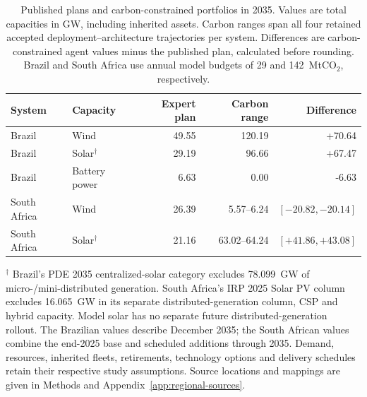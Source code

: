 \begin{table}[tbp]
\caption{Published plans and carbon-constrained portfolios in 2035. Values are total capacities in GW, including inherited assets. Carbon ranges span all four retained accepted deployment--architecture trajectories per system. Differences are carbon-constrained agent values minus the published plan, calculated before rounding. Brazil and South Africa use annual model budgets of 29 and 142~MtCO$_2$, respectively.}
\label{tab:expert-capacity}
\centering\small
\setlength{\tabcolsep}{5pt}
\begin{tabularx}{\textwidth}{@{}lXrrr@{}}
\toprule
System & Capacity & Expert plan & Carbon range & Difference \\
\midrule
Brazil & Wind & 49.55 & 120.19 & +70.64 \\
Brazil & Solar$^\dagger$ & 29.19 & 96.66 & +67.47 \\
Brazil & Battery power & 6.63 & 0.00 & -6.63 \\
South Africa & Wind & 26.39 & 5.57--6.24 & \([-20.82,-20.14]\) \\
South Africa & Solar$^\dagger$ & 21.16 & 63.02--64.24 & \([+41.86,+43.08]\) \\
\bottomrule
\end{tabularx}
\smallskip
\par\footnotesize $^\dagger$ Brazil's PDE 2035 centralized-solar category excludes 78.099~GW of micro-/mini-distributed generation. South Africa's IRP 2025 Solar PV column excludes 16.065~GW in its separate distributed-generation column, CSP and hybrid capacity. Model solar has no separate future distributed-generation rollout. The Brazilian values describe December 2035; the South African values combine the end-2025 base and scheduled additions through 2035. Demand, resources, inherited fleets, retirements, technology options and delivery schedules retain their respective study assumptions. Source locations and mappings are given in Methods and Appendix~\ref{app:regional-sources}.
\end{table}
